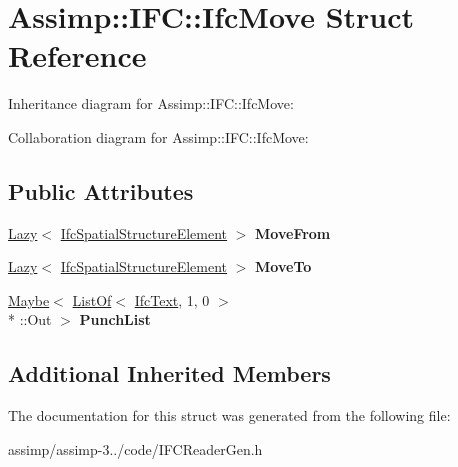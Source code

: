 \hypertarget{struct_assimp_1_1_i_f_c_1_1_ifc_move}{\section{Assimp\+:\+:I\+F\+C\+:\+:Ifc\+Move Struct Reference}
\label{struct_assimp_1_1_i_f_c_1_1_ifc_move}
}


Inheritance diagram for Assimp\+:\+:I\+F\+C\+:\+:Ifc\+Move\+:


Collaboration diagram for Assimp\+:\+:I\+F\+C\+:\+:Ifc\+Move\+:
\subsection*{Public Attributes}
\begin{DoxyCompactItemize}
\item 
\hypertarget{struct_assimp_1_1_i_f_c_1_1_ifc_move_a2dfd71c71f81e5a16916815515e3a4e9}{\hyperlink{struct_assimp_1_1_s_t_e_p_1_1_lazy}{Lazy}$<$ \hyperlink{struct_assimp_1_1_i_f_c_1_1_ifc_spatial_structure_element}{Ifc\+Spatial\+Structure\+Element} $>$ {\bfseries Move\+From}}\label{struct_assimp_1_1_i_f_c_1_1_ifc_move_a2dfd71c71f81e5a16916815515e3a4e9}

\item 
\hypertarget{struct_assimp_1_1_i_f_c_1_1_ifc_move_add4f7da01ae990b464c629a8c5bf04fd}{\hyperlink{struct_assimp_1_1_s_t_e_p_1_1_lazy}{Lazy}$<$ \hyperlink{struct_assimp_1_1_i_f_c_1_1_ifc_spatial_structure_element}{Ifc\+Spatial\+Structure\+Element} $>$ {\bfseries Move\+To}}\label{struct_assimp_1_1_i_f_c_1_1_ifc_move_add4f7da01ae990b464c629a8c5bf04fd}

\item 
\hypertarget{struct_assimp_1_1_i_f_c_1_1_ifc_move_aa34985ee6e4eb3e2c87498843bd772b5}{\hyperlink{struct_assimp_1_1_s_t_e_p_1_1_maybe}{Maybe}$<$ \hyperlink{struct_assimp_1_1_s_t_e_p_1_1_list_of}{List\+Of}$<$ \hyperlink{class_assimp_1_1_s_t_e_p_1_1_e_x_p_r_e_s_s_1_1_primitive_data_type}{Ifc\+Text}, 1, 0 $>$\\*
\+::Out $>$ {\bfseries Punch\+List}}\label{struct_assimp_1_1_i_f_c_1_1_ifc_move_aa34985ee6e4eb3e2c87498843bd772b5}

\end{DoxyCompactItemize}
\subsection*{Additional Inherited Members}


The documentation for this struct was generated from the following file\+:\begin{DoxyCompactItemize}
\item 
assimp/assimp-\/3../code/I\+F\+C\+Reader\+Gen.\+h\end{DoxyCompactItemize}
